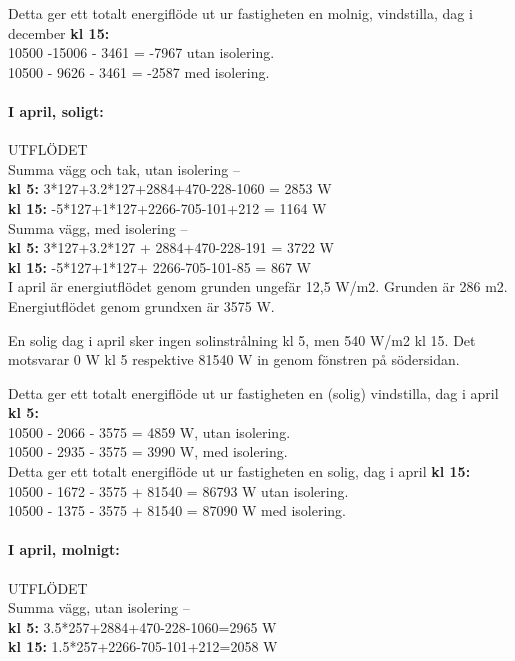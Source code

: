 Detta ger ett totalt energiflöde ut ur fastigheten en molnig, vindstilla, dag i december \textbf{kl 15:}\\
10500 -15006 - 3461 = -7967 utan isolering.\\
10500 - 9626 - 3461 = -2587 med isolering.\\


\paragraph{I april, soligt:}
UTFLÖDET\\
Summa vägg och tak, utan isolering –\\
\textbf{kl 5:} 3*127+3.2*127+2884+470-228-1060 = 2853 W\\
\textbf{kl 15:} -5*127+1*127+2266-705-101+212 = 1164 W\\

Summa vägg, med isolering –\\
\textbf{kl 5:} 3*127+3.2*127 + 2884+470-228-191 = 3722 W\\
\textbf{kl 15:} -5*127+1*127+ 2266-705-101-85 = 867 W\\

I april är energiutflödet genom grunden ungefär 12,5 W/m2. Grunden är 286 m2.\\
Energiutflödet genom grundxen är 3575 W.

En solig dag i april sker ingen solinstrålning kl 5, men 540 W/m2 kl 15. Det motsvarar 0 W kl 5 respektive 81540 W in genom fönstren på södersidan.

Detta ger ett totalt energiflöde ut ur fastigheten en (solig) vindstilla, dag i april \textbf{kl 5:}\\
10500 - 2066 - 3575 =  4859 W, utan isolering.\\
10500 - 2935 - 3575 =  3990 W, med isolering.\\

Detta ger ett totalt energiflöde ut ur fastigheten en solig, dag i april \textbf{kl 15:}\\
10500 - 1672 - 3575 + 81540 = 86793 W utan isolering.\\
10500 - 1375 - 3575 + 81540  =  87090 W med isolering.\\



\paragraph{I april, molnigt:}
UTFLÖDET\\
Summa vägg, utan isolering –\\ 
\textbf{kl 5:} 3.5*257+2884+470-228-1060=2965 W\\
\textbf{kl 15:} 1.5*257+2266-705-101+212=2058 W\\

